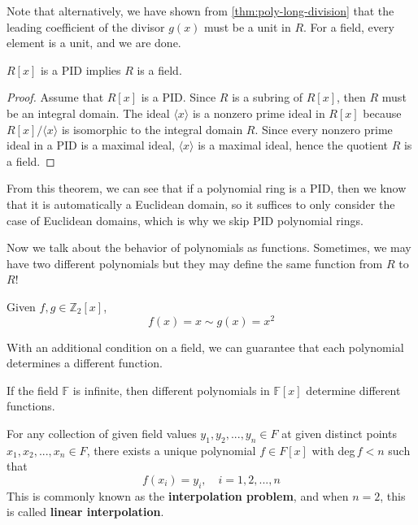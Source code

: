   Note that alternatively, we have shown from \ref{thm:poly-long-division} that the leading coefficient of the divisor $g(x)$ must be a unit in $R$. For a field, every element is a unit, and we are done. 

  \begin{theorem}
    \label{thm:pid-field}
    $R[x]$ is a PID implies $R$ is a field.
  \end{theorem}
  \begin{proof}
    Assume that $R[x]$ is a PID. Since $R$ is a subring of $R[x]$, then $R$ must be an integral domain. The ideal $\langle x \rangle$ is a nonzero prime ideal in $R[x]$ because $R[x]/\langle x \rangle$ is isomorphic to the integral domain $R$. Since every nonzero prime ideal in a PID is a maximal ideal, $\langle x \rangle$ is a maximal ideal, hence the quotient $R$ is a field. 
  \end{proof} 

  From this theorem, we can see that if a polynomial ring is a PID, then we know that it is automatically a Euclidean domain, so it suffices to only consider the case of Euclidean domains, which is why we skip PID polynomial rings. 

  Now we talk about the behavior of polynomials as functions. Sometimes, we may have two different polynomials but they may define the same function from $R$ to $R$! 

  \begin{example}
    Given $f, g \in \mathbb{Z}_2 [x]$, 
    \begin{equation}
      f(x) = x \sim g(x) = x^2
    \end{equation} 
  \end{example} 

  With an additional condition on a field, we can guarantee that each polynomial determines a different function. 

  \begin{theorem}
    If the field $\mathbb{F}$ is infinite, then different polynomials in $\mathbb{F}[x]$ determine different functions. 
  \end{theorem}

  \begin{theorem}[Interpolation]
    For any collection of given field values $y_1, y_2, ..., y_n \in F$ at given distinct points $x_1, x_2, ..., x_n \in F$, there exists a unique polynomial $f \in F[x]$ with deg$\, f < n$ such that
    \begin{equation}
      f(x_i) = y_i, \quad i = 1, 2, ..., n
    \end{equation}
    This is commonly known as the \textbf{interpolation problem}, and when $n = 2$, this is called \textbf{linear interpolation}. 
  \end{theorem} 

